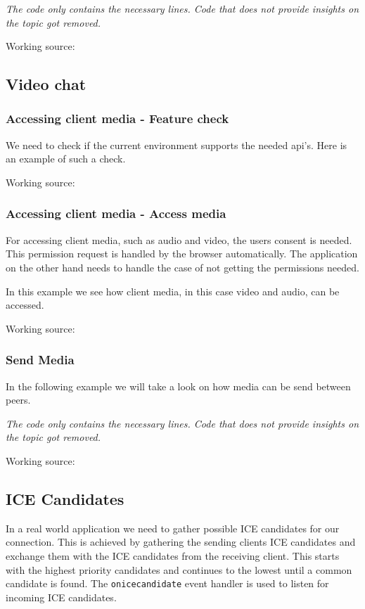 \textit{The code only contains the necessary lines. Code that does not provide insights on the topic got removed.}

Working source:~\autocite{webrtc:senddata}

\subsection{Video chat}

\subsubsection{Accessing client media - Feature check}
We need to check if the current environment supports the needed \Gls{api}'s. Here is an example of such a check.

Working source:~\autocite{media:featurecheck}

\subsubsection{Accessing client media - Access media}
For accessing client media, such as audio and video, the users consent is needed. This permission request is handled by the browser automatically. The application on the other hand needs to handle the case of not getting the permissions needed.

In this example we see how client media, in this case video and audio, can be accessed.

Working source:~\autocite{media:access}

\subsubsection{Send Media}
In the following example we will take a look on how media can be send between peers.

\textit{The code only contains the necessary lines. Code that does not provide insights on the topic got removed.}

Working source:~\autocite{webrtc:sendmedia}

\subsection{ICE Candidates}
In a real world application we need to gather possible ICE candidates for our connection. This is achieved by gathering the sending clients ICE candidates and exchange them with the ICE candidates from the receiving client. This starts with the highest priority candidates and continues to the lowest until a common candidate is found. The \lstinline[basicstyle=\ttfamily\color{black}]|onicecandidate| event handler is used to listen for incoming ICE candidates.